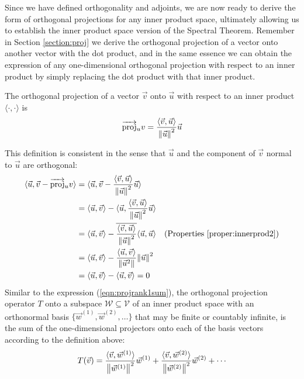 Since we have defined orthogonality and adjoints, we are now ready to derive the form of orthogonal projections for any inner product space, ultimately allowing us to establish the inner product space version of the Spectral Theorem. Remember in Section \ref{section:proj} we derive the orthogonal projection of a vector onto another vector with the dot product, and in the same essence we can obtain the expression of any one-dimensional orthogonal projection with respect to an inner product by simply replacing the dot product with that inner product.
\begin{defn}
\label{defn:orthoprojinner}
The orthogonal projection of a vector $\vec{v}$ onto $\vec{u}$ with respect to an inner product $\langle \cdot, \cdot \rangle$ is
\begin{align*}
\overrightarrow{\text{proj}}_u v = \frac{\langle \vec{v}, \vec{u}\rangle}{\norm{\vec{u}}^2} \vec{u}
\end{align*}
\end{defn}
This definition is consistent in the sense that $\vec{u}$ and the component of $\vec{v}$ normal to $\vec{u}$ are orthogonal:
\begin{align*}
\langle \vec{u}, \vec{v} - \overrightarrow{\text{proj}}_u v \rangle &= \langle \vec{u}, \vec{v} - \frac{\langle \vec{v}, \vec{u}\rangle}{\norm{\vec{u}}^2} \vec{u} \rangle \\
&= \langle \vec{u}, \vec{v} \rangle - \langle \vec{u}, \frac{\langle \vec{v}, \vec{u}\rangle}{\norm{\vec{u}}^2} \vec{u} \rangle \\
&= \langle \vec{u}, \vec{v} \rangle - \overline{\frac{\langle \vec{v}, \vec{u}\rangle}{\norm{\vec{u}}^2}} \langle \vec{u}, \vec{u} \rangle & \text{(Properties \ref{proper:innerprod2})}\\
&= \langle \vec{u}, \vec{v} \rangle - \frac{\langle \vec{u}, \vec{v}\rangle}{\norm{\vec{u}^2}} {\norm{\vec{u}}^2} \\
&= \langle \vec{u}, \vec{v} \rangle -  \langle \vec{u}, \vec{v} \rangle = 0
\end{align*}
Similar to the expression (\ref{eqn:projrank1sum}), the orthogonal projection operator $T$ onto a subspace $\mathcal{W} \subseteq \mathcal{V}$ of an inner product space with an orthonormal basis $\{\vec{w}^{(1)}, \vec{w}^{(2)}, \ldots\}$ that may be finite or countably infinite, is the sum of the one-dimensional projectors onto each of the basis vectors according to the definition above:
\begin{align}
T(\vec{v}) = \frac{\langle \vec{v}, \vec{w}^{(1)}\rangle}{\norm{\vec{w}^{(1)}}^2} \vec{w}^{(1)} + \frac{\langle \vec{v}, \vec{w}^{(2)}\rangle}{\norm{\vec{w}^{(2)}}^2} \vec{w}^{(2)} + \cdots \label{eqn:orthoprojinner}
\end{align}
